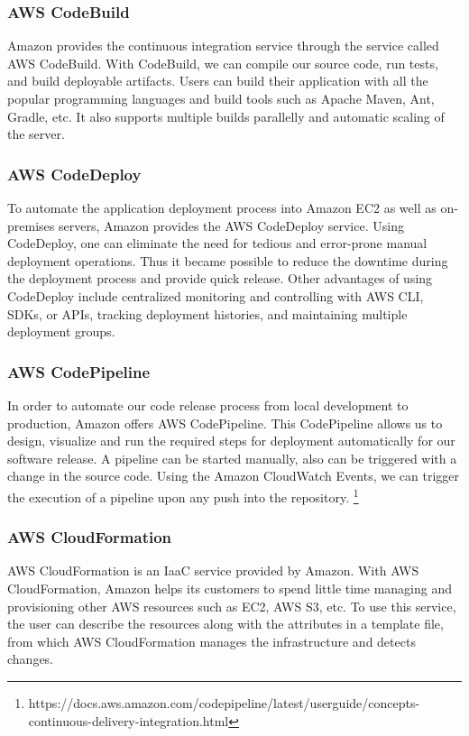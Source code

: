 \subsubsection{AWS CodeBuild}
%
Amazon provides the continuous integration service through the service called AWS CodeBuild. With CodeBuild, we can compile our source code, run tests, and build deployable artifacts. Users can build their application with all the popular programming languages and build tools such as Apache Maven, Ant, Gradle, etc. It also supports multiple builds parallelly and automatic scaling of the server.   
%

\subsubsection{AWS CodeDeploy}
%
To automate the application deployment process into Amazon EC2 as well as on-premises servers, Amazon provides the AWS CodeDeploy service. Using CodeDeploy, one can eliminate the need for tedious and error-prone manual deployment operations. Thus it became possible to reduce the downtime during the deployment process and provide quick release. Other advantages of using CodeDeploy include centralized monitoring and controlling with AWS CLI, SDKs, or APIs, tracking deployment histories, and maintaining multiple deployment groups.  
%

\subsubsection{AWS CodePipeline}
%
In order to automate our code release process from local development to production, Amazon offers AWS CodePipeline. This CodePipeline allows us to design, visualize and run the required steps for deployment automatically for our software release. A pipeline can be started manually, also can be triggered with a change in the source code. Using the Amazon CloudWatch Events, we can trigger the execution of a pipeline upon any push into the repository. \footnote{https://docs.aws.amazon.com/codepipeline/latest/userguide/concepts-continuous-delivery-integration.html}
%

\subsubsection{AWS CloudFormation}
%
AWS CloudFormation is an IaaC service provided by Amazon. With AWS CloudFormation, Amazon helps its customers to spend little time managing and provisioning other AWS resources such as EC2, AWS S3, etc. To use this service, the user can describe the resources along with the attributes in a template file, from which AWS CloudFormation manages the infrastructure and detects changes. 
%

